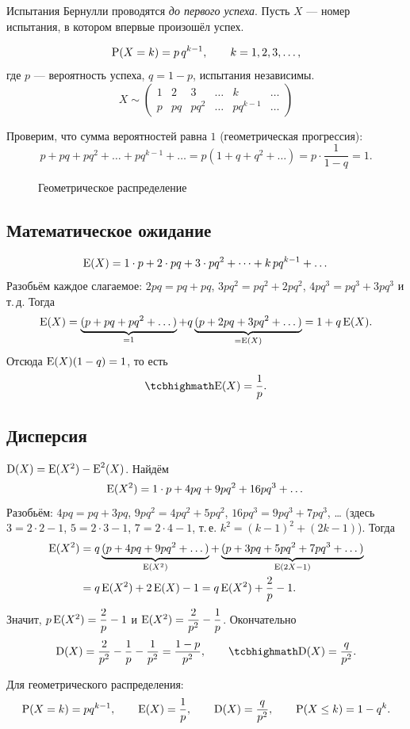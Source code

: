 \documentclass[11pt,a4paper]{article}
\begin{document}
Испытания Бернулли проводятся \emph{до первого успеха}. Пусть $X$ — номер испытания, в котором впервые произошёл успех.

\begin{opr}
\[
\P(X=k)=p\,q^{k-1},\qquad k=1,2,3,\dots,
\]
где $p$ — вероятность успеха, $q=1-p$, испытания независимы.
\[
X\sim\begin{pmatrix}1&2&3&\dots&k&\dots\\ p&pq&pq^2&\dots&pq^{k-1}&\dots\end{pmatrix}
\]
\end{opr}

Проверим, что сумма вероятностей равна $1$ (геометрическая прогрессия):
\[
p+pq+pq^2+\dots+pq^{k-1}+\dots=p(1+q+q^2+\dots)=p\cdot\frac1{1-q}=1.
\]

\begin{figure}[H]
\centering
{}
\caption{Геометрическое распределение}
\end{figure}

\subsection{Математическое ожидание}
\[
\E(X)=1\cdot p+2\cdot pq+3\cdot pq^2+\dots+k\,pq^{k-1}+\dots
\]
Разобьём каждое слагаемое: $2pq=pq+pq$, $3pq^2=pq^2+2pq^2$, $4pq^3=pq^3+3pq^3$ и т.\,д. Тогда
\[
\E(X)=\underbrace{(p+pq+pq^2+\dots)}_{=1}+q\underbrace{(p+2pq+3pq^2+\dots)}_{=\E(X)}=1+q\E(X).
\]
Отсюда $\E(X)(1-q)=1$, то есть
\[
\kbox{\E(X)=\frac1p.}
\]

\subsection{Дисперсия}
$\D(X)=\E(X^2)-\E^2(X)$. Найдём
\[
\E(X^2)=1\cdot p+4pq+9pq^2+16pq^3+\dots
\]
Разобьём: $4pq=pq+3pq$, $9pq^2=4pq^2+5pq^2$, $16pq^3=9pq^3+7pq^3$, \dots{} (здесь $3=2\cdot2-1$, $5=2\cdot3-1$, $7=2\cdot4-1$,
т.\,е. $k^2=(k-1)^2+(2k-1)$). Тогда
\begin{align*}
\E(X^2)&=q\underbrace{(p+4pq+9pq^2+\dots)}_{\E(X^2)}+\underbrace{(p+3pq+5pq^2+7pq^3+\dots)}_{\E(2X-1)}\\
&=q\E(X^2)+2\E(X)-1=q\E(X^2)+\frac2p-1.
\end{align*}
Значит, $p\E(X^2)=\dfrac2p-1$ и $\E(X^2)=\dfrac2{p^2}-\dfrac1p$. Окончательно
\[
\D(X)=\frac2{p^2}-\frac1p-\frac1{p^2}=\frac{1-p}{p^2},\qquad \kbox{\D(X)=\frac{q}{p^2}.}
\]

\begin{itog}
Для геометрического распределения:
\[
\P(X=k)=pq^{k-1},\qquad \E(X)=\frac1p,\qquad \D(X)=\frac q{p^2},\qquad \P(X\le k)=1-q^k.
\]
\end{itog}
\end{document}
